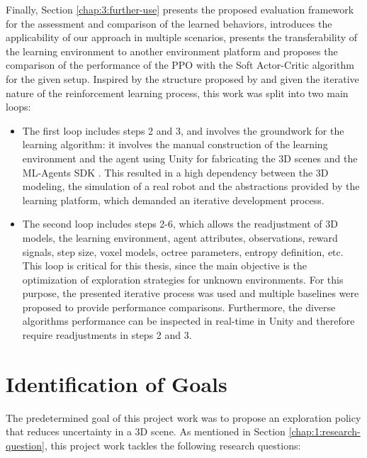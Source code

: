 Finally, Section \ref{chap:3:further-use} presents the proposed evaluation framework for the assessment and comparison of the learned behaviors, introduces the applicability of our approach in multiple scenarios, presents the transferability of the learning environment to another environment platform and proposes the comparison of the performance of the PPO with the Soft Actor-Critic algorithm for the given setup.
Inspired by the structure proposed by \textcite{luckert2016using} and given the iterative nature of the reinforcement learning process, this work was split into two main loops:
\begin{itemize}
    \item The first loop includes steps 2 and 3, and involves the groundwork for the learning algorithm: it involves the manual construction of the learning environment and the agent using Unity \cite{unity2021} for fabricating the 3D scenes and the ML-Agents SDK \cite{github-unity-mlagents-toolkit}. This resulted in a high dependency between the 3D modeling, the simulation of a real robot and the  abstractions provided by the learning platform, which demanded an iterative development process.
    
    \item The second loop includes steps 2-6, which allows the readjustment of 3D models, the learning environment, agent attributes, observations, reward signals, step size, voxel models, octree parameters, entropy definition, etc. This loop is critical for this thesis, since the main objective is the optimization of exploration strategies for unknown environments. For this purpose, the presented iterative process was used and multiple baselines were proposed to provide performance comparisons. Furthermore, the diverse algorithms performance can be inspected in real-time in Unity and therefore require readjustments in steps 2 and 3.

\end{itemize}

%  
\section{Identification of Goals}\label{chap:3:goal}
The predetermined goal of this project work was to propose an exploration policy that reduces uncertainty in a 3D scene. As mentioned in Section \ref{chap:1:research-question}, this project work tackles the following research questions: 


